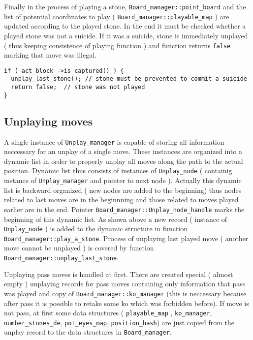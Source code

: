 Finally in the process of playing a stone, {\tt Board\_\-manager::point\_\-board} and the list of potential coordinates to play ( {\tt Board\_\-manager::playable\_\-map} ) are updated according to the played stone. In the end it must be checked whether a played stone was not a suicide. If it was a suicide, stone is immediately unplayed ( thus keeping consistence of playing function ) and function returns {\tt false} marking that move was illegal. 

\footnotesize\begin{verbatim}if ( act_block_->is_captured() ) { 
  unplay_last_stone(); // stone must be prevented to commit a suicide
  return false;  // stone was not played 
}
\end{verbatim}
\normalsize
\subsection{Unplaying moves}\label{page_6_page_6__sec_4}
A single instance of {\tt Unplay\_\-manager} is capable of storing all information neccessary for an unplay of a single move. These instances are organized into a dynamic list in order to properly unplay all moves along the path to the actual position. Dynamic list thus consists of instances of {\tt Unplay\_\-node} ( containig instance of {\tt Unplay\_\-manager} and pointer to next node ). Actually this dynamic list is backward organized ( new nodes are added to the beginning) thus nodes related to last moves are in the beginnning and those related to moves played earlier are in the end. Pointer {\tt Board\_\-manager::Unplay\_\-node\_\-handle} marks the beginning of this dynamic list. As shown above a new record ( instance of {\tt Unplay\_\-node} ) is added to the dynamic structure in function {\tt Board\_\-manager::play\_\-a\_\-stone}. Process of unplaying last played move ( another move cannot be unplayed ) is covered by function {\tt Board\_\-manager::unplay\_\-last\_\-stone}.

Unplaying pass moves is handled at first. There are created special ( almost empty ) unplaying records for pass moves containing only information that pass was played and copy of {\tt Board\_\-manager::ko\_\-manager} (this is neccessary because after pass it is possible to retake some ko which was forbidden before). If move is not pass, at first some data structures ( {\tt playable\_\-map} , {\tt ko\_\-manager}, {\tt number\_\-stones\_\-de}, {\tt pot\_\-eyes\_\-map}, {\tt position\_\-hash}) are just copied from the unplay record to the data structures in {\tt Board\_\-manager}. 

